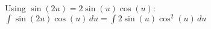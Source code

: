\documentclass[preview]{standalone}
\begin{document}
\begin{center}
Using $\sin(2u) = 2\sin(u)\cos(u)$: $\int \sin(2u) \cos(u) \, du = \int 2\sin(u)\cos^2(u) \, du$
\end{center}
\end{document}

